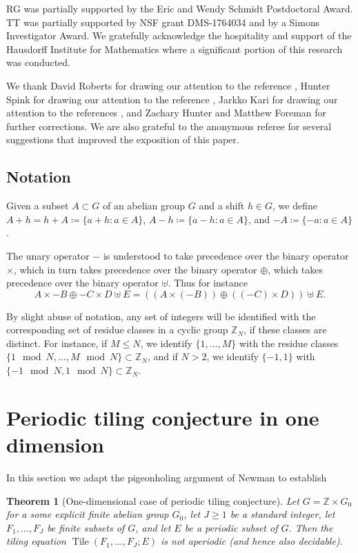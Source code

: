 \documentclass[reqno,a4paper,12pt]{amsart}
\numberwithin{equation}{section}
\numberwithin{figure}{section}
\def\Z{\mathbb{Z}}
\renewcommand\leq{\leqslant}
\renewcommand\geq{\geqslant}
\newcommand{\Tile}{\operatorname{Tile}}
\theoremstyle{plain}
\newtheorem{theorem}[thm]{Theorem}
\theoremstyle{definition}
\begin{document}
RG was partially supported by the Eric and Wendy
Schmidt Postdoctoral Award. TT was partially supported by NSF grant DMS-1764034 and by a Simons Investigator Award. We gratefully acknowledge the hospitality and support of the Hausdorff Institute for Mathematics where a significant portion of this research was conducted. 

We thank David Roberts for drawing our attention to  the reference \cite{socolar-taylor}, Hunter Spink for drawing our attention to the reference \cite{glt}, Jarkko Kari for drawing our attention to the references \cite{k92,kp,Lukk}, and Zachary Hunter and Matthew Foreman for further corrections.  We are also grateful to the anonymous referee for several suggestions that improved the exposition of this paper.

\subsection{Notation}\label{notation-sec}

Given a subset $A \subset G$ of an abelian group $G$ and a shift $h \in G$, we define $A+h = h+A\coloneqq \{ a+h: a \in A \}$, $A-h \coloneqq \{ a-h: a \in A \}$, and $-A \coloneqq \{-a: a \in A \}$.

The unary operator $-$ is understood to take precedence over the binary operator $\times$, which in turn takes precedence over the binary operator $\oplus$, which takes precedence over the binary operator $\uplus$.  Thus for instance
$$ A \times -B \oplus -C \times D \uplus E = ((A \times (-B)) \oplus ((-C) \times D)) \uplus E.$$

By slight abuse of notation, any set of integers will be identified with the corresponding set of residue classes in a cyclic group $\Z_N$, if these classes are distinct.  For instance, if $M \leq N$, we identify $\{1,\dots,M\}$ with the residue classes $\{1 \mod N, \dots, M \mod N \} \subset \Z_N$, and if $N>2$, we identify $\{-1,1\}$ with $\{-1 \mod N, 1 \mod N \} \subset \Z_N$.

\section{Periodic tiling conjecture in one dimension}\label{one-tile}

In this section we adapt the pigeonholing argument of Newman \cite{N} to establish

\begin{theorem}[One-dimensional case of periodic tiling conjecture]\label{oned}  Let $G = \Z \times G_0$ for a some explicit finite abelian group $G_0$, let $J \geq 1$ be a standard integer, let $F_1,\dots,F_J$ be finite subsets of $G$, and let $E$ be a periodic subset of $G$.  Then the tiling equation $\Tile(F_1,\dots,F_J; E)$ is not aperiodic (and hence also decidable).
\end{theorem}
\end{document}
